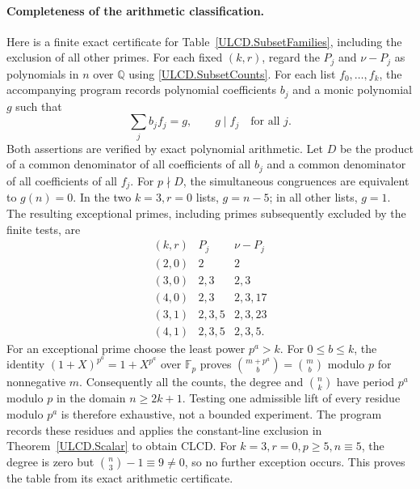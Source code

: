 \documentclass[11pt,a4paper]{article}
\numberwithin{equation}{section}
\begin{document}
\paragraph{Completeness of the arithmetic classification.}
Here is a finite exact certificate for Table~\ref{ULCD.SubsetFamilies}, including
the exclusion of all other primes. For each fixed $(k,r)$, regard the
$P_j$ and $\nu-P_j$ as polynomials in $n$ over $\mathbb Q$ using
\eqref{ULCD.SubsetCounts}. For each list $f_0,\ldots,f_k$, the accompanying program
records polynomial coefficients $b_j$ and a monic polynomial $g$ such that
\[
 \sum_j b_jf_j=g,\qquad g\mid f_j\quad\text{for all }j.
\]
Both assertions are verified by exact polynomial arithmetic. Let $D$ be
the product of a common denominator of all coefficients of all $b_j$ and
a common denominator of all coefficients of all $f_j$.
For $p\nmid D$, the simultaneous congruences are equivalent to $g(n)=0$.
In the two $k=3,r=0$ lists, $g=n-5$; in all other lists, $g=1$.
The resulting exceptional primes, including primes subsequently excluded
by the finite tests, are
\[
\begin{array}{c|cc}
(k,r)&P_j&\nu-P_j\\\hline
(2,0)&2&2\\
(3,0)&2,3&2,3\\
(4,0)&2,3&2,3,17\\
(3,1)&2,3,5&2,3,23\\
(4,1)&2,3,5&2,3,5.
\end{array}
\]
For an exceptional prime choose the least power $p^a>k$. For $0\leq b\leq k$,
the identity $(1+X)^{p^a}=1+X^{p^a}$ over $\mathbb F_p$ proves
$\binom{m+p^a}{b}=\binom mb$ modulo $p$ for nonnegative $m$.
Consequently all the counts, the degree and $\binom nk$ have period $p^a$
modulo $p$ in the domain $n\geq2k+1$. Testing one admissible lift of every
residue modulo $p^a$ is therefore exhaustive, not a bounded experiment.
The program records these residues and applies the constant-line exclusion
in Theorem~\ref{ULCD.Scalar} to obtain CLCD. For $k=3,r=0,p\geq5,n\equiv5$,
the degree is zero but $\binom n3-1\equiv9\ne0$, so no further exception
occurs. This proves the table from its exact arithmetic certificate.
\end{document}
